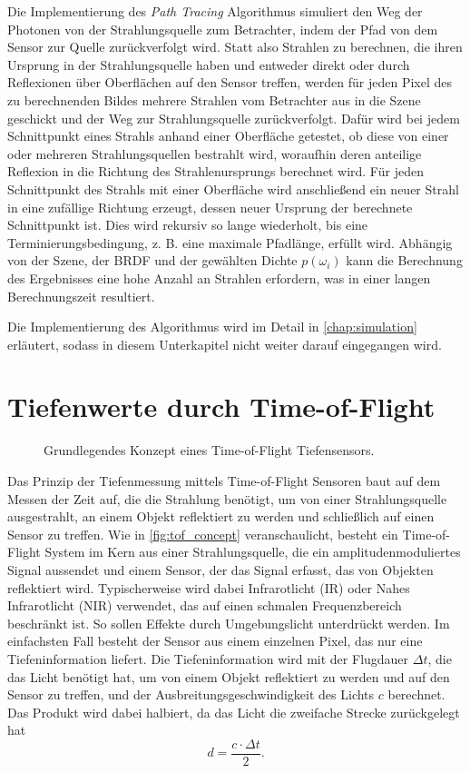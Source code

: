\documentclass[thesis.tex]{subfiles}
\begin{document}
Die Implementierung des \emph{Path Tracing} Algorithmus simuliert den Weg der Photonen von der Strahlungsquelle zum Betrachter, indem der Pfad von dem Sensor zur Quelle zurückverfolgt wird. Statt also Strahlen zu berechnen, die ihren Ursprung in der Strahlungsquelle haben und entweder direkt oder durch Reflexionen über Oberflächen auf den Sensor treffen, werden für jeden Pixel des zu berechnenden Bildes mehrere Strahlen vom Betrachter aus in die Szene geschickt und der Weg zur Strahlungsquelle zurückverfolgt. Dafür wird bei jedem Schnittpunkt eines Strahls anhand einer Oberfläche getestet, ob diese von einer oder mehreren Strahlungsquellen bestrahlt wird, woraufhin deren anteilige Reflexion in die Richtung des Strahlenursprungs berechnet wird. Für jeden Schnittpunkt des Strahls mit einer Oberfläche wird anschließend ein neuer Strahl in eine zufällige Richtung erzeugt, dessen neuer Ursprung der berechnete Schnittpunkt ist. Dies wird rekursiv so lange wiederholt, bis eine Terminierungsbedingung, z. B. eine maximale Pfadlänge, erfüllt wird. Abhängig von der Szene, der BRDF und der gewählten Dichte $p({\omega_i})$ kann die Berechnung des Ergebnisses eine hohe Anzahl an Strahlen erfordern, was in einer langen Berechnungszeit resultiert.

Die Implementierung des Algorithmus wird im Detail in \autoref{chap:simulation} erläutert, sodass in diesem Unterkapitel nicht weiter darauf eingegangen wird. 

\section{Tiefenwerte durch Time-of-Flight}\label{chap:time_of_flight}

\begin{figure}[ht]
    \centering
    \caption{Grundlegendes Konzept eines Time-of-Flight Tiefensensors.}
    \label{fig:tof_concept}
\end{figure}

Das Prinzip der Tiefenmessung mittels Time-of-Flight Sensoren baut auf dem Messen der Zeit auf, die die Strahlung benötigt, um von einer Strahlungsquelle ausgestrahlt, an einem Objekt reflektiert zu werden und schließlich auf einen Sensor zu treffen. Wie in \autoref{fig:tof_concept} veranschaulicht, besteht ein Time-of-Flight System im Kern aus einer Strahlungsquelle, die ein amplitudenmoduliertes Signal aussendet und einem Sensor, der das Signal erfasst, das von Objekten reflektiert wird. Typischerweise wird dabei Infrarotlicht (IR) oder Nahes Infrarotlicht (NIR) verwendet, das auf einen schmalen Frequenzbereich beschränkt ist. So sollen Effekte durch Umgebungslicht unterdrückt werden. Im einfachsten Fall besteht der Sensor aus einem einzelnen Pixel, das nur eine Tiefeninformation liefert. Die Tiefeninformation wird mit der Flugdauer $\Delta t$, die das Licht benötigt hat, um von einem Objekt reflektiert zu werden und auf den Sensor zu treffen, und der Ausbreitungsgeschwindigkeit des Lichts $c$ berechnet. Das Produkt wird dabei halbiert, da das Licht die zweifache Strecke zurückgelegt hat \begin{equation}d = \frac{c \cdot \Delta t}{2}.\label{eq:distancefromtime}\end{equation}
\end{document}
